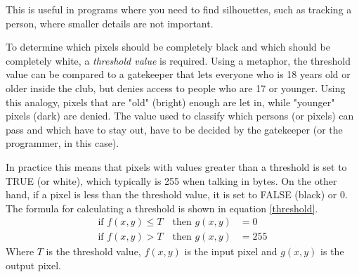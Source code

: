 This is useful in programs where you need to find silhouettes, such as tracking a person, where smaller details are not important.

To determine which pixels should be completely black and which should be completely white, a \textit{threshold value} is required. Using a metaphor, the threshold value can be compared to a gatekeeper that lets everyone who is 18 years old or older inside the club, but denies access to people who are 17 or younger. Using this analogy, pixels that are "old" (bright) enough are let in, while "younger" pixels (dark) are denied. The value used to classify which persons (or pixels) can pass and which have to stay out, have to be decided by the gatekeeper (or the programmer, in this case).

In practice this means that pixels with values greater than a threshold is set to TRUE (or white), which typically is 255 when talking in bytes. On the other hand, if a pixel is less than the threshold value, it is set to FALSE (black) or 0. The formula for calculating a threshold is shown in equation \ref{threshold}.
\begin{equation}
  \begin{aligned}
  	\text{if } f(x,y)\leq T \quad \text{then } g(x,y)&= 0 \\
  	\text{if } f(x,y)>T \quad \text{then } g(x,y)&= 255
	\label{threshold}  
  \end{aligned} 
\end{equation}
Where $T$ is the threshold value, $f(x,y)$ is the input pixel and $g(x,y)$ is the output pixel. 

